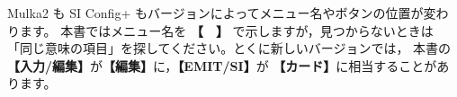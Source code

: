 \documentclass[a4paper,10pt,openany]{ltjsbook}
\begin{document}
\vspace{8pt}
\begin{Note}[画面の表記について]
Mulka2 も SI Config+ もバージョンによってメニュー名やボタンの位置が変わります。
本書ではメニュー名を \textbf{【　】} で示しますが，見つからないときは
「同じ意味の項目」を探してください。とくに新しいバージョンでは，
本書の \textbf{【入力/編集】}が\textbf{【編集】}に，\textbf{【EMIT/SI】}が
\textbf{【カード】}に相当することがあります。
\end{Note}

\tableofcontents



\mainmatter
\setcounter{chapter}{-1}









\end{document}
